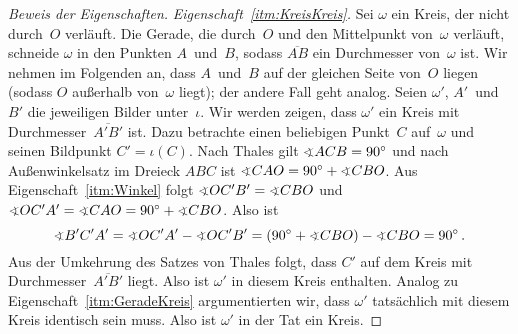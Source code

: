 \begin{proof}[Beweis der Eigenschaften]
	\emph{Eigenschaft~\ref{itm:KreisKreis}.} Sei $\omega$ ein Kreis, der nicht durch~$O$ verläuft. Die Gerade, die durch~$O$ und den Mittelpunkt von~$\omega$ verläuft, schneide $\omega$ in den Punkten $A$~und~$B$, sodass $\overline{AB}$ ein Durchmesser von~$\omega$ ist. Wir nehmen im Folgenden an, dass $A$~und~$B$ auf der gleichen Seite von~$O$ liegen (sodass $O$ außerhalb von~$\omega$ liegt); der andere Fall geht analog. Seien $\omega'$, $A'$~und~$B'$ die jeweiligen Bilder unter~$\iota$. Wir werden zeigen, dass $\omega'$ ein Kreis mit Durchmesser~$\overline{A'B'}$ ist. Dazu betrachte einen beliebigen Punkt~$C$ auf~$\omega$ und seinen Bildpunkt $C'=\iota(C)$. Nach Thales gilt $\winkel ACB=90^\circ$ und nach Außenwinkelsatz im Dreieck $ABC$ ist $\winkel CAO=90^\circ+\winkel CBO$. Aus Eigenschaft~\ref{itm:Winkel} folgt $\winkel OC'B'=\winkel CBO$ und $\winkel OC'A'=\winkel CAO=90^\circ+\winkel CBO$. Also ist
	\begin{equation*}
		\winkel B'C'A'=\winkel OC'A'-\winkel OC'B'= \parens{90^\circ+\winkel CBO}-\winkel CBO=90^\circ\,.
	\end{equation*}
	Aus der Umkehrung des Satzes von Thales folgt, dass $C'$ auf dem Kreis mit Durchmesser~$\overline{A'B'}$ liegt. Also ist $\omega'$ in diesem Kreis enthalten. Analog zu Eigenschaft~\ref{itm:GeradeKreis} argumentierten wir, dass $\omega'$ tatsächlich mit diesem Kreis identisch sein muss. Also ist $\omega'$ in der Tat ein Kreis.
	

\end{proof}
